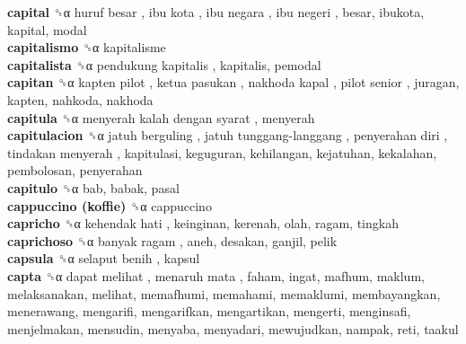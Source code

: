 \textbf{capital} ␝α   huruf besar ,  ibu kota ,  ibu negara ,  ibu negeri , besar, ibukota, kapital, modal  \\
\textbf{capitalismo} ␝α  kapitalisme  \\
\textbf{capitalista} ␝α   pendukung kapitalis , kapitalis, pemodal  \\
\textbf{capitan} ␝α   kapten pilot ,  ketua pasukan ,  nakhoda kapal ,  pilot senior , juragan, kapten, nahkoda, nakhoda  \\
\textbf{capitula} ␝α   menyerah kalah dengan syarat , menyerah  \\
\textbf{capitulacion} ␝α   jatuh berguling ,  jatuh tunggang-langgang ,  penyerahan diri ,  tindakan menyerah , kapitulasi, keguguran, kehilangan, kejatuhan, kekalahan, pembolosan, penyerahan  \\
\textbf{capitulo} ␝α  bab, babak, pasal  \\
\textbf{cappuccino (koffie)} ␝α  cappuccino  \\
\textbf{capricho} ␝α   kehendak hati , keinginan, kerenah, olah, ragam, tingkah  \\
\textbf{caprichoso} ␝α   banyak ragam , aneh, desakan, ganjil, pelik  \\
\textbf{capsula} ␝α   selaput benih , kapsul  \\
\textbf{capta} ␝α   dapat melihat ,  menaruh mata , faham, ingat, mafhum, maklum, melaksanakan, melihat, memafhumi, memahami, memaklumi, membayangkan, menerawang, mengarifi, mengarifkan, mengartikan, mengerti, menginsafi, menjelmakan, mensudin, menyaba, menyadari, mewujudkan, nampak, reti, taakul  \\
